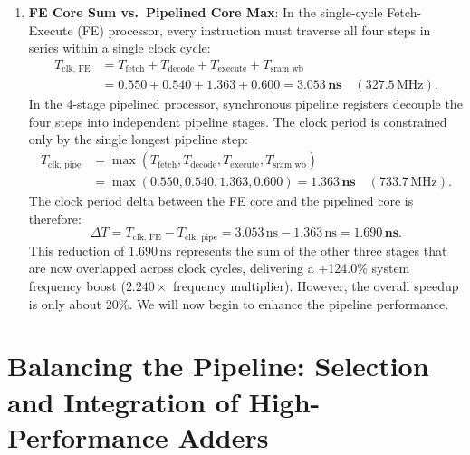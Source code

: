 \begin{enumerate}
    \item \textbf{FE Core Sum vs.\ Pipelined Core Max}:
    In the single-cycle Fetch-Execute (FE) processor, every instruction must traverse all four steps in series within a single clock cycle:
    \begin{align}
    T_{\text{clk, FE}} &= T_{\text{fetch}} + T_{\text{decode}} + T_{\text{execute}} + T_{\text{sram\_wb}} \nonumber \\
                       &= 0.550 + 0.540 + 1.363 + 0.600 = \mathbf{3.053\,\text{ns}} \quad (327.5\,\text{MHz}).
    \end{align}
    In the 4-stage pipelined processor, synchronous pipeline registers decouple the four steps into independent pipeline stages. The clock period is constrained only by the single longest pipeline step:
    \begin{align}
    T_{\text{clk, pipe}} &= \max\left(T_{\text{fetch}}, T_{\text{decode}}, T_{\text{execute}}, T_{\text{sram\_wb}}\right) \nonumber \\
                         &= \max(0.550, 0.540, 1.363, 0.600) = \mathbf{1.363\,\text{ns}} \quad (733.7\,\text{MHz}).
    \end{align}
    The clock period delta between the FE core and the pipelined core is therefore:
    \begin{equation}
    \Delta T = T_{\text{clk, FE}} - T_{\text{clk, pipe}} = 3.053\,\text{ns} - 1.363\,\text{ns} = \mathbf{1.690\,\text{ns}}.
    \end{equation}
    This reduction of $1.690\,\text{ns}$ represents the sum of the other three stages that are now overlapped across clock cycles, delivering a +124.0\% system frequency boost ($2.240\times$ frequency multiplier). However, the overall speedup is only about 20\%. We will now begin to enhance the pipeline performance.
\end{enumerate}

\section{Balancing the Pipeline: Selection and Integration of High-Performance Adders}\label{riscvAdderBalancing}

